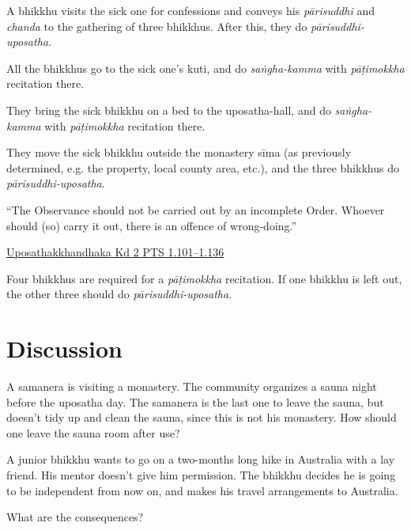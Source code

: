 \begin{exam}{\autoExamName}
\begin{problem}
\begin{manswers}{1}
     A bhikkhu visits the sick one for confessions and conveys his
    \emph{pārisuddhi} and \emph{chanda} to the gathering of three bhikkhus.
    After this, they do \emph{pārisuddhi-uposatha}.\eAns

     All the bhikkhus go to the sick one's kuti, and do \emph{saṅgha-kamma}
    with \emph{pāṭimokkha} recitation there.\eAns

     They bring the sick bhikkhu on a bed to the uposatha-hall, and do
    \emph{saṅgha-kamma} with \emph{pāṭimokkha} recitation there.\eAns

     They move the sick bhikkhu outside the monastery sīma (as previously
    determined, e.g. the property, local county area, etc.), and the three
    bhikkhus do \emph{pārisuddhi-uposatha}.\eAns

    \eChoices
  \end{manswers}

  \begin{solution}

    ``The Observance should not be carried out by an incomplete Order. Whoever
    should (so) carry it out, there is an offence of wrong-doing.''

    \href{https://suttacentral.net/pli-tv-kd2/en/horner-brahmali}{Uposathakkhandhaka Kd 2 PTS 1.101–1.136}

    Four bhikkhus are required for a \emph{pāṭimokkha} recitation. If one
    bhikkhu is left out, the other three should do \emph{pārisuddhi-uposatha}.

  \end{solution}

\end{problem}

\end{exam}

\section*{Discussion}

A samanera is visiting a monastery. The community organizes a sauna night before
the uposatha day. The samanera is the last one to leave the sauna, but doesn't
tidy up and clean the sauna, since this is not his monastery.
How should one leave the sauna room after use?

\bigskip

A junior bhikkhu wants to go on a two-months long hike in Australia with a lay
friend. His mentor doesn't give him permission. The bhikkhu decides he is going
to be independent from now on, and makes his travel arrangements to Australia.

What are the consequences?

